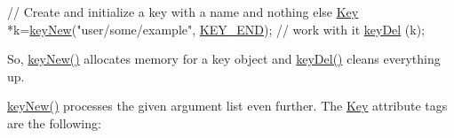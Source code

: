 \begin{DoxyCodeInclude}
\textcolor{comment}{// Create and initialize a key with a name and nothing else}
\hyperlink{classkdb_1_1Key_a5679f5cae63caddd64a60388b9cc77fa}{Key} *k=\hyperlink{group__key_gad23c65b44bf48d773759e1f9a4d43b89}{keyNew}(\textcolor{stringliteral}{"user/some/example"}, \hyperlink{group__key_gga91fb3178848bd682000958089abbaf40aa8adb6fcb92dec58fb19410eacfdd403}{KEY\_END});
\textcolor{comment}{// work with it}
\hyperlink{group__key_ga3df95bbc2494e3e6703ece5639be5bb1}{keyDel} (k);
\end{DoxyCodeInclude}
 So, \hyperlink{group__key_gad23c65b44bf48d773759e1f9a4d43b89}{key\+New()} allocates memory for a key object and \hyperlink{group__key_ga3df95bbc2494e3e6703ece5639be5bb1}{key\+Del()} cleans everything up.

\hyperlink{group__key_gad23c65b44bf48d773759e1f9a4d43b89}{key\+New()} processes the given argument list even further. The \hyperlink{classkdb_1_1Key}{Key} attribute tags are the following\+:
